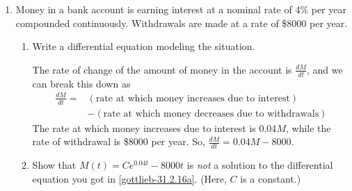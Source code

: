 \documentclass{article}
\begin{document}
\begin{enumerate}
\begin{enumerate}
    \begin{solution}
      If nobody has heard the rumor, it should not spread; nobody is able
      to spread it because nobody knows it!

      If everybody has heard the rumor, it should not spread either; there
      is nobody new to spread it to.

      So, when $R = 0$ or $R = N$, $\frac{dR}{dt}$ should be 0.  This is
      only true of the . 
    \end{solution}

  \end{enumerate}


\pspace{\newpage}

\item \label{gottlieb-31.2.16-parts}

  Money in a bank account is earning interest at a nominal rate of 4\% per
  year compounded continuously. Withdrawals are made at a rate of \$8000
  per year.  

  \begin{enumerate}

  \item \label{gottlieb-31.2.16a}
    \begin{problem}
      Write a differential equation modeling the situation.
    \end{problem}

    \begin{solution}
      The rate of change of the amount of money in the account is
      $\frac{dM}{dt}$, and we can break this down as
      \begin{align*}
        \frac{dM}{dt} = {} & (\text{rate at which money increases due to
          interest}) \\
        & - (\text{rate at which money decreases due to withdrawals})
      \end{align*}
      The rate at which money increases due to interest is $0.04 M$, while
      the rate of withdrawal is \$8000 per year.  So, $\boxed{
        \frac{dM}{dt} = 0.04M - 8000}$.
    \end{solution}

  \item \label{gottlieb-31.2.16d}

    \begin{problem}
      Show that $M(t) = Ce^{0.04t} - 8000t$ is \emph{not} a solution to
      the differential equation you got in \ref{gottlieb-31.2.16a}.
      (Here, $C$ is a constant.)
    \end{problem}
    \pspace{\vfill}


\end{enumerate}
\end{enumerate}
\end{document}
